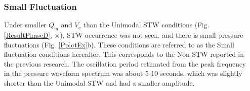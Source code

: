 \documentclass[aps,pre,preprint,groupedaddress,showkeys]{revtex4-2}
\begin{document}
\subsubsection{Small Fluctuation}
Under smaller $Q_\mathrm{in}$ and $V_ \mathrm {c} $ than the Unimodal STW conditions (Fig. \ref {ResultPhaseD}, $\times$), STW occurrence was not seen, and there is small pressure fluctuations (Fig. \ref {PplotEx}b).
These conditions are referred to as the Small fluctuation conditions hereafter.
This corresponds to the Non-STW reported in the previous research.
The oscillation period estimated from the peak frequency in the pressure waveform spectrum was about 5-10 seconds, which was slightly shorter than the Unimodal STW and had a smaller amplitude.
\end{document}

